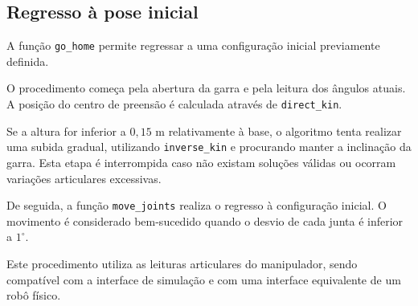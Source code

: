 \subsection{Regresso à pose inicial}

A função \texttt{go\_home} permite regressar a uma configuração inicial previamente definida.

O procedimento começa pela abertura da garra e pela leitura dos ângulos atuais. A posição do centro de preensão é calculada através de \texttt{direct\_kin}.

Se a altura for inferior a $0{,}15$ m relativamente à base, o algoritmo tenta realizar uma subida gradual, utilizando \texttt{inverse\_kin} e procurando manter a inclinação da garra. Esta etapa é interrompida caso não existam soluções válidas ou ocorram variações articulares excessivas.

De seguida, a função \texttt{move\_joints} realiza o regresso à configuração inicial. O movimento é considerado bem-sucedido quando o desvio de cada junta é inferior a $1^\circ$.

Este procedimento utiliza as leituras articulares do manipulador, sendo compatível com a interface de simulação e com uma interface equivalente de um robô físico.
